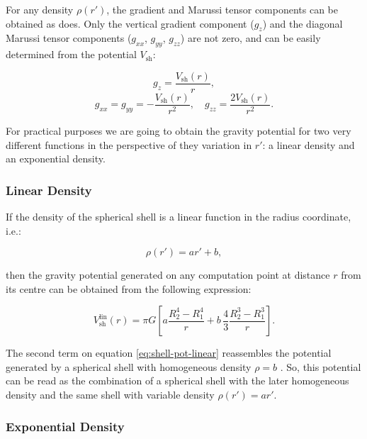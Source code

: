 \documentclass[extra]{gji}
\begin{document}
For any density $\rho(r')$, the gradient and Marussi tensor components can be obtained as \citet{Grombein2013} does. Only the vertical gradient component ($g_z$) and the diagonal Marussi tensor components ($g_{xx}$, $g_{yy}$, $g_{zz}$) are not zero, and can be easily determined from the potential $V_\text{sh}$:

\begin{equation}
    g_z = \frac{V_\text{sh}(r)}{r},
\end{equation}
\begin{equation}
    g_{xx} = g_{yy} = -\frac{V_\text{sh}(r)}{r^2}, \quad
    g_{zz} = \frac{2V_\text{sh}(r)}{r^2}.
\end{equation}

For practical purposes we are going to obtain the gravity potential for two very different functions in the perspective of they variation in $r'$: a linear density and an exponential density.


\subsubsection{Linear Density}

If the density of the spherical shell is a linear function in the radius coordinate, i.e.:

\begin{equation}
    \rho(r') = ar' + b,
\end{equation}

\noindent then the gravity potential generated on any computation point at distance $r$ from its centre can be obtained from the following expression:

\begin{equation}
    V_\text{sh}^\text{lin}(r) = \pi G \left[ 
    a \frac{R_2^4 - R_1^4}{r} +
    b \,\frac{4}{3} \frac{R_2^3 - R_1^3}{r} \right].
    \label{eq:shell-pot-linear}
\end{equation}

The second term on equation \ref{eq:shell-pot-linear} reassembles the potential generated by a spherical shell with homogeneous density $\rho = b$ \citep{Mikuska2006,Grombein2013}.
So, this potential can be read as the combination of a spherical shell with the later homogeneous density and the same shell with variable density $\rho(r') = ar'$.


\subsubsection{Exponential Density}
\end{document}
